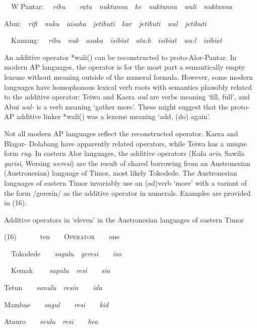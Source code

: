 \ \ W Pantar: \ \ \textit{ribu\ \ \ \ ratu\ \ nuktanna{\ng}\ \ ke\ \ }\textit{nuktanna}\textit{{\ng}}\textit{\ \ }\textit{wali\ \ nuktanna{\ng}}

Abui:\ \ \textit{rifi\ \ nuku\ \ aisaha\ \ jeti{\ng}buti\ \ kar\ \ jeti{\ng}buti\ \ wal\ \ jeti{\ng}buti}

 \ \ Kamang: \ \ \textit{ribu\ \ nuk\ \ asaka\ \ isi{\ng}biat\ \ ata:k\ \ isi{\ng}biat\ \ wa:l\ \ isi{\ng}biat}

An additive operator *wali({\ng}) can be reconstructed to proto-Alor-Pantar. In modern AP languages, the operator is for the most part a semantically empty lexeme without meaning outside of the numeral formula. However, some modern languages have homophonous lexical verb roots with semantics plausibly related to the additive operator: Teiwa and Kaera \textit{wal }are verbs meaning {\textquoteleft}fill, full{\textquoteright}, and Abui \textit{wal- }is a verb meaning {\textquoteleft}gather more{\textquoteright}. These might suggest that the proto-AP additive linker *wali({\ng}) was a lexeme meaning {\textquoteleft}add, (do) again{\textquoteright}. 

Not all modern AP languages reflect the reconstructed operator. Kaera and Blagar- Dolabang have apparently related operators, while Teiwa has a unique form \textit{rug}. In eastern Alor languages, the additive operators (Kula \textit{aris}\textit{{\textbari}}\textit{{\ng}}, Sawila \textit{garisi{\ng}}, Wersing \textit{weresi{\ng}}) are the result of shared borrowing from an Austronesian (Austronesian) language of Timor, most likely Tokodede. The Austronesian languages of eastern Timor invariably use an (ad)verb {\textquoteleft}more{\textquoteright} with a variant of the form /geresin/ as the additive operator in numerals. Examples are provided in (16).  \textit{ }

Additive operators in {\textquoteleft}eleven{\textquoteright} in the Austronesian languages of eastern Timor

(16)  \ \ \ \ \ \ ten\ \ \ \ O\textsc{perator}\ \ \ \ one\ \ 

\ \ Tokodede\ \ \ \ \textit{sagulu\ \ geresi\ \ \ \ iso\ \ \ \ }

\ \ Kemak \ \ \ \ \textit{sapulu\ \ resi\ \ \ \ sia\ \ \ \ }

Tetun\ \ \ \ \textit{sanulu\ \ resin\ \ \ \ ida\ \ \ \ }

Mambae\ \ \ \ \textit{sagul\ \ \ \ resi\ \ \ \ kid\ \ \ \ }

Atauro\ \ \ \ \textit{se{\ng}ulu\ \ resi\ \ \ \ hea\ \ \ \ }

